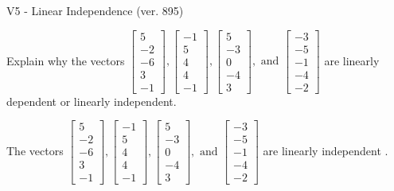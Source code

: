 \begin{exercise}
  \begin{exerciseTitle}V5 - Linear Independence (ver. 895)\end{exerciseTitle}
  \begin{exerciseStatement}
    Explain why the vectors \(\left[\begin{array}{r}
5 \\
-2 \\
-6 \\
3 \\
-1
\end{array}\right] , \left[\begin{array}{r}
-1 \\
5 \\
4 \\
4 \\
-1
\end{array}\right] , \left[\begin{array}{r}
5 \\
-3 \\
0 \\
-4 \\
3
\end{array}\right] , \text{ and } \left[\begin{array}{r}
-3 \\
-5 \\
-1 \\
-4 \\
-2
\end{array}\right]\) are linearly dependent or linearly independent.	


  \end{exerciseStatement}
  \begin{exerciseAnswer}
   The vectors \(\left[\begin{array}{r}
5 \\
-2 \\
-6 \\
3 \\
-1
\end{array}\right] , \left[\begin{array}{r}
-1 \\
5 \\
4 \\
4 \\
-1
\end{array}\right] , \left[\begin{array}{r}
5 \\
-3 \\
0 \\
-4 \\
3
\end{array}\right] , \text{ and } \left[\begin{array}{r}
-3 \\
-5 \\
-1 \\
-4 \\
-2
\end{array}\right]\) are 
  	 linearly independent  .
  


  \end{exerciseAnswer}
\end{exercise}